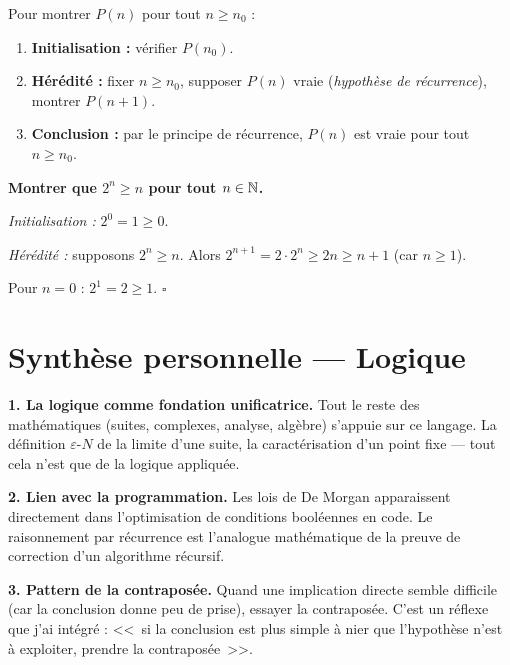 \begin{methodbox}
Pour montrer $P(n)$ pour tout $n \geqslant n_0$ :
\begin{enumerate}[leftmargin=1.5cm]
  \item \textbf{Initialisation :} vérifier $P(n_0)$.
  \item \textbf{Hérédité :} fixer $n \geqslant n_0$, supposer $P(n)$ vraie (\textit{hypothèse de récurrence}), montrer $P(n+1)$.
  \item \textbf{Conclusion :} par le principe de récurrence, $P(n)$ est vraie pour tout $n \geqslant n_0$.
\end{enumerate}
\end{methodbox}

\begin{exbox}
\textbf{Montrer que $2^n \geqslant n$ pour tout $n \in \mathbb{N}$.}

\textit{Initialisation :} $2^0 = 1 \geqslant 0$. \checkmark

\textit{Hérédité :} supposons $2^n \geqslant n$. Alors $2^{n+1} = 2 \cdot 2^n \geqslant 2n \geqslant n + 1$ (car $n \geqslant 1$).

Pour $n = 0$ : $2^1 = 2 \geqslant 1$. \checkmark \hfill$\square$
\end{exbox}


\section{Synthèse personnelle --- Logique}

\begin{intuitionbox}
\textbf{1. La logique comme fondation unificatrice.} Tout le reste des mathématiques (suites, complexes, analyse, algèbre) s'appuie sur ce langage. La définition $\varepsilon$-$N$ de la limite d'une suite, la caractérisation d'un point fixe --- tout cela n'est que de la logique appliquée.

\textbf{2. Lien avec la programmation.} Les lois de De Morgan apparaissent directement dans l'optimisation de conditions booléennes en code. Le raisonnement par récurrence est l'analogue mathématique de la preuve de correction d'un algorithme récursif.

\textbf{3. Pattern de la contraposée.} Quand une implication directe semble difficile (car la conclusion donne peu de prise), essayer la contraposée. C'est un réflexe que j'ai intégré : <<~si la conclusion est plus simple à nier que l'hypothèse n'est à exploiter, prendre la contraposée~>>.
\end{intuitionbox}


